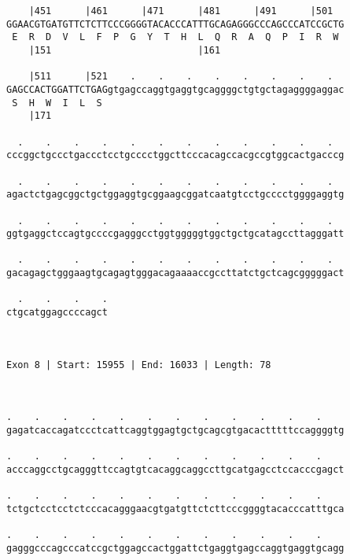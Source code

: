 \documentclass{article}
\begin{document}
\begin{Verbatim}
    |451      |461      |471      |481      |491      |501  
GGAACGTGATGTTCTCTTCCCGGGGTACACCCATTTGCAGAGGGCCCAGCCCATCCGCTG
 E  R  D  V  L  F  P  G  Y  T  H  L  Q  R  A  Q  P  I  R  W 
    |151                          |161                      
  
    |511      |521    .    .    .    .    .    .    .    .  
GAGCCACTGGATTCTGAGgtgagccaggtgaggtgcaggggctgtgctagaggggaggac
 S  H  W  I  L  S                                           
    |171                                                    
  
  .    .    .    .    .    .    .    .    .    .    .    .  
cccggctgccctgaccctcctgcccctggcttcccacagccacgccgtggcactgacccg
                                                            
  .    .    .    .    .    .    .    .    .    .    .    .  
agactctgagcggctgctggaggtgcggaagcggatcaatgtcctgcccctggggaggtg
                                                            
  .    .    .    .    .    .    .    .    .    .    .    .  
ggtgaggctccagtgccccgagggcctggtgggggtggctgctgcatagccttagggatt
                                                            
  .    .    .    .    .    .    .    .    .    .    .    .  
gacagagctgggaagtgcagagtgggacagaaaaccgccttatctgctcagcgggggact
                                                            
  .    .    .    .
ctgcatggagccccagct
                  
                  
 
Exon 8 | Start: 15955 | End: 16033 | Length: 78



.    .    .    .    .    .    .    .    .    .    .    .    
gagatcaccagatccctcattcaggtggagtgctgcagcgtgacactttttccaggggtg
                                                            
.    .    .    .    .    .    .    .    .    .    .    .    
acccaggcctgcagggttccagtgtcacaggcaggccttgcatgagcctccacccgagct
                                                            
.    .    .    .    .    .    .    .    .    .    .    .    
tctgctcctcctctcccacagggaacgtgatgttctcttcccggggtacacccatttgca
                                                            
.    .    .    .    .    .    .    .    .    .    .    .    
gagggcccagcccatccgctggagccactggattctgaggtgagccaggtgaggtgcagg
                                                            

\end{Verbatim}
\end{document}
